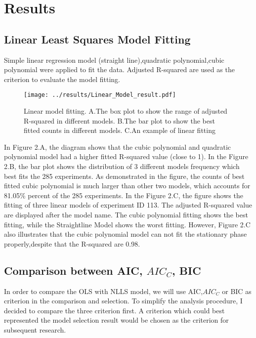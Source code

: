 \documentclass[11pt]{article}
\begin{document}
  \section{Results}
  \linenumbers
  \subsection{Linear Least Squares Model Fitting}
    
      Simple linear regression model (straight line),quadratic polynomial,cubic polynomial were applied to fit the data. Adjusted R-squared are used as the criterion to evaluate the model fitting.
    
      \begin{figure}[H]
        \centering
        \texttt{[image: ../results/Linear\_Model\_result.pdf]}
        \caption{Linear model fitting. A.The box plot to show the range of adjusted R-squared in different models. B.The bar plot to show the best fitted counts in different models. C.An example of linear fitting}
      \end{figure}
    
      In Figure 2.A, the diagram shows that the cubic polynomial and quadratic polynomial model had a higher fitted R-squared value (close to 1). In the Figure 2.B, the bar plot shows the distribution of 3 different models frequency which best fits the 285 experiments. As demonstrated in the figure, the counts of best fitted cubic polynomial is much larger than other two models, which accounts for 81.05\% percent of the 285 experiments. In the Figure 2.C, the figure shows the fitting of three linear models of experiment ID 113. The adjusted R-squared value are displayed after the model name. The cubic polynomial fitting shows the best fitting, while the Straightline Model shows the worst fitting. However, Figure 2.C also illustrates that the cubic polynomial model can not fit the stationary phase properly,despite that the R-squared are 0.98. 
  
  \subsection{Comparison between AIC, $AIC_C$, BIC}
      
      In order to compare the OLS with NLLS model, we will use AIC,$AIC_C$ or BIC as criterion in the comparison and selection. To simplify the analysis procedure, I decided to compare the three criterion first. A criterion which could best represented the model selection result would be chosen as the criterion for subsequent research. 
      
\end{document}
